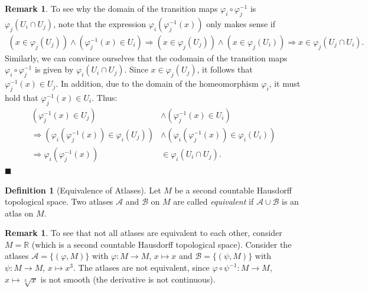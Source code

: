 \documentclass[12pt, a4paper]{article}
\numberwithin{equation}{section}
\theoremstyle{definition}
\theoremstyle{definition}
\newtheorem{defn}[thm]{Definition} %
\newtheorem{remark}[thm]{Remark} %
\begin{document}
	\begin{remark}
		To see why the domain of the transition maps $\varphi_i \circ \varphi_j^{-1}$ is $\varphi_j\left(U_i \cap U_j\right)$, note that the expression $\varphi_i\left(\varphi_j^{-1}\left(x\right)\right)$ only makes sense if 
		\begin{align*}
			\left(x\in \varphi_j(U_j)\right) \wedge  \left(\varphi_j^{-1}\left(x\right)\in U_i\right) \Rightarrow \left(x\in \varphi_j(U_j)\right) \wedge \left(x\in \varphi_j\left(U_i\right)\right) \Rightarrow x\in \varphi_j(U_j \cap U_i). 
		\end{align*}
		Similarly, we can convince ourselves that the codomain of the transition maps $\varphi_i\circ\varphi_j^{-1}$ is given by $\varphi_i(U_i\cap U_j)$. Since $x\in \varphi_j(U_j)$, it follows that $\varphi_j^{-1}(x)\in U_j$. In addition, due to the domain of the homeomorphism $\varphi_i$, it must hold that $\varphi_j^{-1}(x) \in U_i$. Thus: 
		\begin{align*}
			\left(\varphi_j^{-1}(x)\in U_j\right) &\wedge \left(\varphi_j^{-1}(x) \in U_i\right) 
			\\
			\Rightarrow 			\left(\varphi_i(\varphi_j^{-1}(x))\in \varphi_i(U_j)\right) &\wedge \left(\varphi_i(\varphi_j^{-1}(x))\in \varphi_i(U_i)\right) 
			\\ 
			\Rightarrow \varphi_i\left(\varphi_j^{-1}(x)\right) &\in \varphi_i\left(U_i\cap U_j\right). 
		\end{align*}
	\qquad\qquad\qquad\qquad\qquad\qquad\qquad\qquad\qquad\qquad\qquad\qquad\qquad\qquad\qquad\qquad\qquad\qquad\qquad\qquad\qquad\quad$\blacksquare$
	\end{remark}
	
	\begin{defn}[Equivalence of Atlases]
		Let $M$ be a second countable Hausdorff topological space. Two atlases $\mathcal A$ and $\mathcal B$ on $M$ are called \textit{equivalent} if $\mathcal A\cup \mathcal B$ is an atlas on $M$.  
	\end{defn}

	\begin{remark}
		To see that not all atlases are equivalent to each other, consider $M = \mathbb R$ (which is a second countable Hausdorff topological space). Consider the atlases $\mathcal A = \{ (\varphi, M) \}$ with $\varphi: M\rightarrow M$, $x\mapsto x$ and $\mathcal B = \{(\psi, M)\}$ with $\psi: M\rightarrow M$, $x\mapsto x^3$. The atlases are not equivalent, since $\varphi\circ \psi^{-1}: M \rightarrow M$, $x\mapsto \sqrt[3]{x}$ is not smooth (the derivative is not continuous). 
	\end{remark}
	
\end{document}
